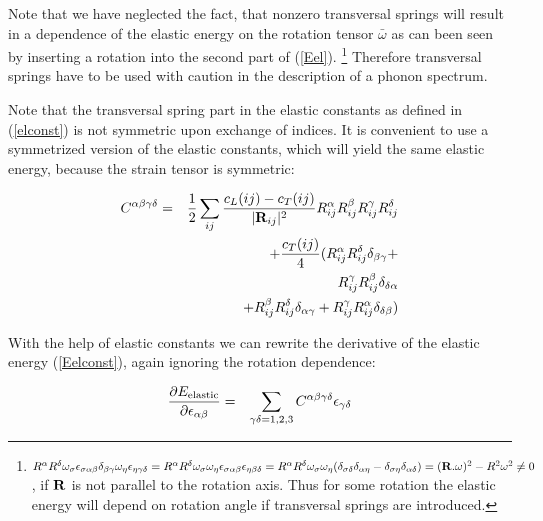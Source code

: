 Note that we have neglected the fact, that nonzero transversal springs will 
result in a dependence of the elastic energy on the rotation tensor $\bar \omega$ as
can been seen by inserting a rotation into the second part of (\ref{Eel}).
\footnote{$R^{\alpha}R^{\delta}\omega_{\sigma}
\epsilon_{\sigma\alpha\beta}\delta_{\beta\gamma}\omega_{\eta}\epsilon_{\eta\gamma\delta}=
R^{\alpha}R^{\delta}\omega_{\sigma} \omega_{\eta}
\epsilon_{\sigma\alpha\beta}\epsilon_{\eta\beta\delta}=
R^{\alpha}R^{\delta}\omega_{\sigma} \omega_{\eta}
(\delta_{\sigma\delta}\delta_{\alpha\eta}-\delta_{\sigma\eta}\delta_{\alpha\delta})=
(\mathbf R . \mathbf \omega)^2-R^2\omega^2 \neq 0$,
if $\mathbf R$ is not parallel to the rotation axis. Thus for some rotation the elastic energy
will depend on rotation angle if transversal springs are  introduced.
}
Therefore transversal springs have to be used with caution
 in the description of a phonon spectrum.

Note that the transversal spring part in the elastic constants as defined in (\ref{elconst}) 
is not symmetric upon exchange of indices. It is convenient to use a symmetrized version
of the elastic constants, which will yield the same elastic energy, because the
strain tensor is symmetric:

{\color{blue}
\begin{eqnarray}\label{elconstsymm}
C^{\alpha\beta\gamma\delta} &= &
 \frac{1}{2}\sum_{ij}\frac{c_L(ij)-c_T(ij)}{|\mathbf R_{ij}|^2} 
R_{ij}^{\alpha}R_{ij}^{\beta}R_{ij}^{\gamma}R_{ij}^{\delta}
 \nonumber \\
&& +    \frac{c_T(ij)}{4} ( R_{ij}^{\alpha}R_{ij}^{\delta}
 \delta_{\beta\gamma}  + \nonumber \\
&&  R_{ij}^{\gamma} R_{ij}^{\beta}
 \delta_{\delta\alpha}  \nonumber \\
&& +    R_{ij}^{\beta}R_{ij}^{\delta}
 \delta_{\alpha\gamma}  +   R_{ij}^{\gamma}R_{ij}^{\alpha}
 \delta_{\delta\beta} ) \nonumber \\
\end{eqnarray}
}


With the help of elastic constants we can rewrite the derivative of the elastic energy
(\ref{Eelconst}), again ignoring the rotation dependence:

\begin{eqnarray}\label{Eelderivelconst}
\frac{\partial E_{\rm elastic}}{\partial \epsilon_{\alpha\beta}}&=&
\sum_{\gamma\delta=1,2,3} C^{\alpha\beta\gamma\delta} \epsilon_{\gamma\delta}
\end{eqnarray}




